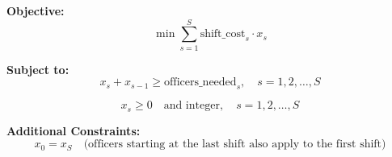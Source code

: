 \documentclass{article}
\begin{document}
\textbf{Objective:}
\[
\min \sum_{s=1}^{S} \text{shift\_cost}_s \cdot x_s
\]

\textbf{Subject to:}
\[
x_s + x_{s-1} \geq \text{officers\_needed}_s, \quad s = 1, 2, \ldots, S
\]

\[
x_s \geq 0 \quad \text{and integer}, \quad s = 1, 2, \ldots, S
\]

\textbf{Additional Constraints:}
\[
x_0 = x_S \quad \text{(officers starting at the last shift also apply to the first shift)}
\]
\end{document}
